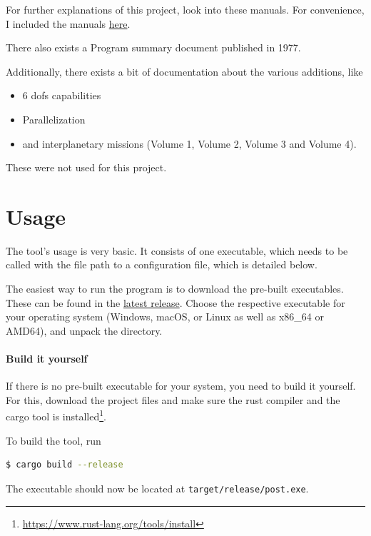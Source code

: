 For further explanations of this project, look into these manuals. For
convenience, I included the manuals \href{https://github.com/TiborVoelcker/post/tree/master/docs/original-manuals/}{here}.

There also exists a Program summary document\cite{PostSummary} published in 1977.

Additionally, there exists a bit of documentation about the various additions,
like
\begin{itemize}
  \item 6 \glspl{dof} capabilities\cite{Post6DFormulations}
  \item Parallelization\cite{Post3D}
  \item and interplanetary missions (Volume 1\cite{IPOSTUsers}, Volume 2\cite{IPOSTAnalytic}, Volume 3\cite{IPOSTProgrammers} and Volume 4\cite{IPOSTSample}).
\end{itemize}

These were not used for this project.

\section{Usage}\label{usage}

The tool's usage is very basic. It consists of one executable, which needs to
be called with the file path to a configuration file, which is detailed below.

The easiest way to run the program is to download the pre-built executables.
These can be found in the \href{https://github.com/TiborVoelcker/post/releases/latest}{latest release}. Choose the respective executable
for your operating system (Windows, macOS, or Linux as well as x86\_64 or AMD64), and
unpack the directory.

\paragraph{Build it yourself}

If there is no pre-built executable for your system, you need to build it yourself. For this, download
the project files and make sure the rust compiler and the cargo tool is installed\footnote{\label{install}\url{https://www.rust-lang.org/tools/install}}.

To build the tool, run
\begin{lstlisting}[language=sh]
 $ cargo build --release
\end{lstlisting}
The executable should now be located at \texttt{target/release/post.exe}.

